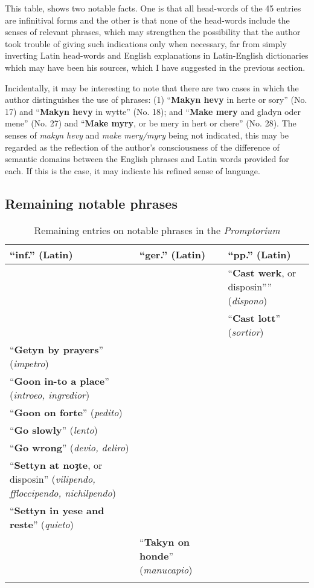 \documentclass[output=paper,colorlinks,citecolor=brown,arabicfont,chinesefont]{langscibook}
\begin{document}
This table, shows two notable facts. One is that all head-words of the 45 entries are infinitival forms and the other is that none of the head-words include the senses of relevant phrases, which may strengthen the possibility that the author took trouble of giving such indications only when necessary, far from simply inverting Latin head-words and English explanations in Latin-English dictionaries which may have been his sources, which I have suggested in the previous section.

Incidentally, it may be interesting to note that there are two cases in which the author distinguishes the use of phrases: (1) “\textbf{Makyn hevy} in herte or sory” (No. 17) and “\textbf{Makyn hevy} in wytte” (No. 18); and “\textbf{Make mery} and gladyn oder mene” (No. 27) and “\textbf{Make myry}, or be mery in hert or chere” (No. 28). The senses of \emph{makyn hevy} and \emph{make mery/myry} being not indicated, this may be regarded as the reflection of the author’s consciousness of the difference of semantic domains between the English phrases and Latin words provided for each. If this is the case, it may indicate his refined sense of language.

\subsection{Remaining notable phrases}

\begin{table}[b]
\caption {Remaining entries on notable phrases in the \textit{Promptorium}}
\label{tab:miyoshi:table11}
\begin{tabularx}{\linewidth}{ QQQ }
\lsptoprule
\textbf{“inf.” (Latin)} &\textbf{“ger.” (Latin)} & \textbf{“pp.” (Latin)} \\
\midrule
 &  & “\textbf{Cast werk}, or disposin”” (\emph{dispono}) \\
 & & “\textbf{Cast lott}” (\emph{sortior}) \\
“\textbf{Getyn by prayers}” (\emph{impetro}) & &  \\
“\textbf{Goon in-to a place}” (\emph{introeo, ingredior}) & &  \\
“\textbf{Goon on forte}” (\emph{pedito}) & &  \\
“\textbf{Go slowly}” (\emph{lento}) &  &  \\
“\textbf{Go wrong}” (\emph{devio, deliro}) &  &  \\
“\textbf{Settyn at noȝte}, or disposin” (\emph{vilipendo, ffloccipendo, nichilpendo}) & & \\
“\textbf{Settyn in yese and reste}” (\emph{quieto}) & & \\
 & “\textbf{Takyn on honde}” (\emph{manucapio}) &  \\
\lspbottomrule
\end{tabularx}
\end{table}
\end{document}

